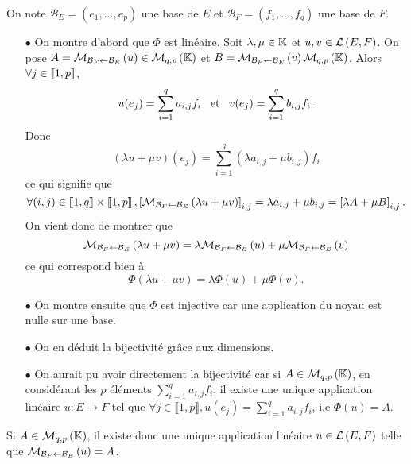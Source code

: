 \documentclass{magnolia}
\begin{document}
\begin{preuve}
On note $\mathcal{B}_E=(e_1,\ldots,e_p)$ une base de $E$ et $\mathcal{B}_F=(f_1,\ldots,f_q)$ une base de $F$.
\begin{itemize} 
\item[$\bullet$] On montre d'abord que $\Phi$ est linéaire. Soit $\lambda,\mu \in \mathbb{K}$ et $u,v\in \mathcal{L}\left(E,F\right)$. On pose $A=\mathcal{M}_{\mathcal{B}_F\gets
  \mathcal{B}_E}\left(u\right) \in \mathcal{M}_{q,p}\left(\mathbb{K}\right)$ et $B=\mathcal{M}_{\mathcal{B}_F\gets
  \mathcal{B}_E}\left(v\right)\mathcal{M}_{q,p}\left(\mathbb{K}\right)$.
  Alors $\forall j\in \left\llbracket 1,p\right\rrbracket$,$$u(e_j)=\sum_{i=1}^qa_{i,j}f_i \quad\!\text{et}\quad\! v(e_j)=\sum_{i=1}^qb_{i,j}f_i.$$
  Donc $$(\lambda u+\mu v)(e_j)=\sum_{i=1}^q(\lambda a_{i,j}+\mu b_{i,j})f_i$$ ce qui signifie que $$\forall (i,j)\in \left\llbracket 1,q\right\rrbracket\times \left\llbracket 1,p\right\rrbracket, \left[\mathcal{M}_{\mathcal{B}_F\gets
  \mathcal{B}_E}\left(\lambda u+\mu v\right)\right]_{i,j}=\lambda a_{i,j}+\mu b_{i,j}=\left[\lambda A+\mu B\right]_{i,j}.$$ On vient donc de montrer que $$\mathcal{M}_{\mathcal{B}_F\gets
  \mathcal{B}_E}\left(\lambda u+\mu v\right)=\lambda \mathcal{M}_{\mathcal{B}_F\gets
  \mathcal{B}_E}\left(u\right)+\mu \mathcal{M}_{\mathcal{B}_F\gets
  \mathcal{B}_E}\left(v\right)$$ ce qui correspond bien à $$\Phi(\lambda u +\mu v)=\lambda \Phi(u)+\mu \Phi(v).$$
\item[$\bullet$] On montre ensuite que $\Phi$ est injective car une application du noyau est nulle sur une base.
\item[$\bullet$] On en déduit la bijectivité grâce aux dimensions.
\item[$\bullet$] On aurait pu avoir directement la bijectivité car si $A\in \mathcal{M}_{q,p}\left(\mathbb{K}\right)$, en considérant les $p$ éléments $\displaystyle\sum_{i=1}^qa_{i,j}f_i$, il existe une unique application linéaire $u:E\to F$ tel que $\forall j \in \llbracket1,p\rrbracket, u(e_j)=\displaystyle\sum_{i=1}^qa_{i,j}f_i$, i.e $\Phi(u)=A$.
\end{itemize}
\end{preuve}

\begin{remarqueUnique}
\remarque Si $A\in\mathcal{M}_{q,p}\left(\mathbb{K}\right)$, il existe donc une unique application
  linéaire $u\in\mathcal{L}\left(E,F\right)$ telle que
  $\mathcal{M}_{\mathcal{B}_F\gets\mathcal{B}_E}\left(u\right)=A$.
\end{remarqueUnique}
\end{document}
